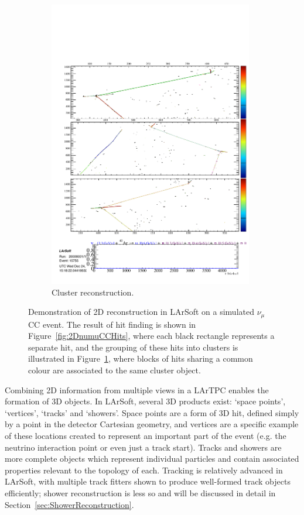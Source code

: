 \begin{figure}
\begin{subfigure}[t]{0.48\linewidth}
    \includegraphics[width=0.98\textwidth]{2DnumuCCClusters.pdf}
    \caption{Cluster reconstruction.}
    \label{fig:2DnumuCCClusters}
  \end{subfigure}
  \caption[Demonstration of 2D reconstruction in LArSoft on a simulated $\nu_{\mu}$CC event.]{Demonstration of 2D reconstruction in LArSoft on a simulated $\nu_{\mu}$CC event.  The result of hit finding is shown in Figure~\ref{fig:2DnumuCCHits}, where each black rectangle represents a separate hit, and the grouping of these hits into clusters is illustrated in Figure~\ref{fig:2DnumuCCClusters}, where blocks of hits sharing a common colour are associated to the same cluster object.}
  \label{fig:2DnumuCC}
\end{figure}

Combining 2D information from multiple views in a LArTPC enables the formation of 3D objects.  In LArSoft, several 3D products exist: `space points', `vertices', `tracks' and `showers'.  Space points are a form of 3D hit, defined simply by a point in the detector Cartesian geometry, and vertices are a specific example of these locations created to represent an important part of the event (e.g. the neutrino interaction point or even just a track start).  Tracks and showers are more complete objects which represent individual particles and contain associated properties relevant to the topology of each.  Tracking is relatively advanced in LArSoft, with multiple track fitters shown to produce well-formed track objects efficiently; shower reconstruction is less so and will be discussed in detail in Section~\ref{sec:ShowerReconstruction}.

